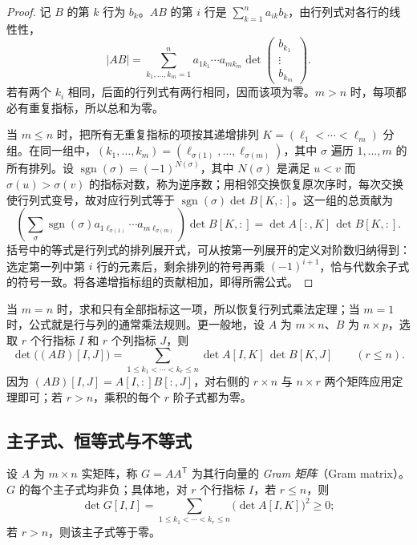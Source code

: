 \begin{proof}
记 $B$ 的第 $k$ 行为 $b_k$。$AB$ 的第 $i$ 行是 $\sum_{k=1}^{n}a_{ik}b_k$，由行列式对各行的线性性，
\[
    |AB|=\sum_{k_1,\ldots,k_m=1}^{n}
        a_{1k_1}\cdots a_{mk_m}
        \det\begin{pmatrix}b_{k_1}\\\vdots\\b_{k_m}\end{pmatrix}.
\]
若有两个 $k_i$ 相同，后面的行列式有两行相同，因而该项为零。$m>n$ 时，每项都必有重复指标，所以总和为零。

当 $m\leq n$ 时，把所有无重复指标的项按其递增排列 $K=(\ell_1<\cdots<\ell_m)$ 分组。在同一组中，$(k_1,\ldots,k_m)=(\ell_{\sigma(1)},\ldots,\ell_{\sigma(m)})$，其中 $\sigma$ 遍历 $1,\ldots,m$ 的所有排列。设 $\operatorname{sgn}(\sigma)=(-1)^{N(\sigma)}$，其中 $N(\sigma)$ 是满足 $u<v$ 而 $\sigma(u)>\sigma(v)$ 的指标对数，称为逆序数；用相邻交换恢复原次序时，每次交换使行列式变号，故对应行列式等于 $\operatorname{sgn}(\sigma)\det B[K,:]$。这一组的总贡献为
\[
    \left(\sum_{\sigma}\operatorname{sgn}(\sigma)
        a_{1\ell_{\sigma(1)}}\cdots a_{m\ell_{\sigma(m)}}\right)
        \det B[K,:]
    =\det A[:,K]\,\det B[K,:].
\]
括号中的等式是行列式的排列展开式，可从按第一列展开的定义对阶数归纳得到：选定第一列中第 $i$ 行的元素后，剩余排列的符号再乘 $(-1)^{i+1}$，恰与代数余子式的符号一致。将各递增指标组的贡献相加，即得所需公式。
\end{proof}

当 $m=n$ 时，求和只有全部指标这一项，所以恢复行列式乘法定理；当 $m=1$ 时，公式就是行与列的通常乘法规则。更一般地，设 $A$ 为 $m\times n$、$B$ 为 $n\times p$，选取 $r$ 个行指标 $I$ 和 $r$ 个列指标 $J$，则
\begin{equation}
\label{eq:matrix-cauchy-binet-minors}
    \det\bigl((AB)[I,J]\bigr)
    =\sum_{1\leq k_1<\cdots<k_r\leq n}
        \det A[I,K]\,\det B[K,J]
    \qquad(r\leq n).
\end{equation}
因为 $(AB)[I,J]=A[I,:]B[:,J]$，对右侧的 $r\times n$ 与 $n\times r$ 两个矩阵应用定理即可；若 $r>n$，乘积的每个 $r$ 阶子式都为零。

\subsection{主子式、恒等式与不等式}

\begin{corollary}
\label{cor:matrix-real-gram-minors}
设 $A$ 为 $m\times n$ 实矩阵，称 $G=AA^{\mathsf T}$ 为其行向量的 \emph{Gram 矩阵}（Gram matrix）。$G$ 的每个主子式均非负；具体地，对 $r$ 个行指标 $I$，若 $r\leq n$，则
\begin{equation}
\label{eq:matrix-gram-minors-squares}
    \det G[I,I]
    =\sum_{1\leq k_1<\cdots<k_r\leq n}
        \bigl(\det A[I,K]\bigr)^2\geq0;
\end{equation}
若 $r>n$，则该主子式等于零。
\end{corollary}

